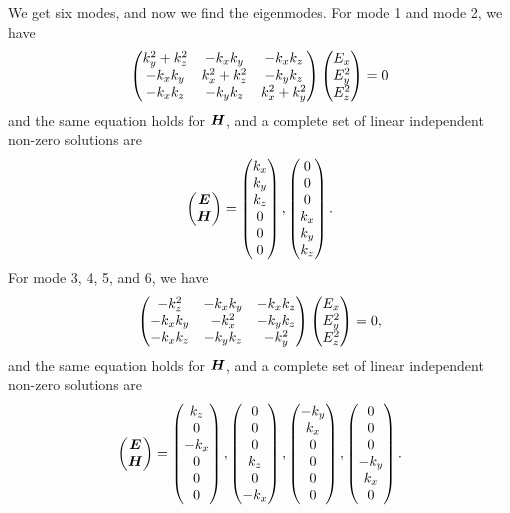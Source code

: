 \documentclass[hyperref, a4paper]{article}
\begin{document}
\begin{itemize}
We get six modes, and now we find the eigenmodes. 
For mode 1 and mode 2, we have 
\[
    \pmqty{
        k_y^2 + k_z^2 & - k_x k_y & - k_x k_z \\
        - k_x k_y & k_x^2 + k_z^2 & - k_y k_z \\
        - k_x k_z & - k_y k_z & k_x^2 + k_y^2 
    } \pmqty{ E_x \\ E_y ^2 \\ E_z^2 } = 0
\]
and the same equation holds for $\vb*{H}$, and a complete set of linear independent non-zero solutions are
\begin{equation}
    \pmqty{\vb*{E} \\ \vb*{H}} = \pmqty{k_x \\ k_y \\ k_z \\ 0 \\ 0 \\ 0},  
    \pmqty{0 \\ 0 \\ 0 \\ k_x \\ k_y \\ k_z}.
    \label{eq:invariant-1}
\end{equation}
For mode 3, 4, 5, and 6, we have 
\[
    \pmqty{
        - k_z^2 & - k_x k_y & - k_x k_z \\
        - k_x k_y & - k_x^2 & - k_y k_z \\
        - k_x k_z & - k_y k_z & - k_y^2 
    } \pmqty{ E_x \\ E_y ^2 \\ E_z^2 } = 0,
\]
and the same equation holds for $\vb*{H}$, and a complete set of linear independent non-zero solutions are 
\begin{equation}
    \pmqty{\vb*{E} \\ \vb*{H}} = \pmqty{k_z \\ 0 \\ - k_x \\ 0 \\ 0 \\ 0}, 
    \pmqty{0 \\ 0 \\ 0 \\ k_z \\ 0 \\ - k_x }, \pmqty{-k_y \\ k_x \\ 0 \\ 0 \\ 0 \\ 0},
    \pmqty{ 0 \\ 0 \\ 0 \\ -k_y \\ k_x \\ 0}.
    \label{eq:invariant-2}
\end{equation}


\end{itemize}
\end{document}
